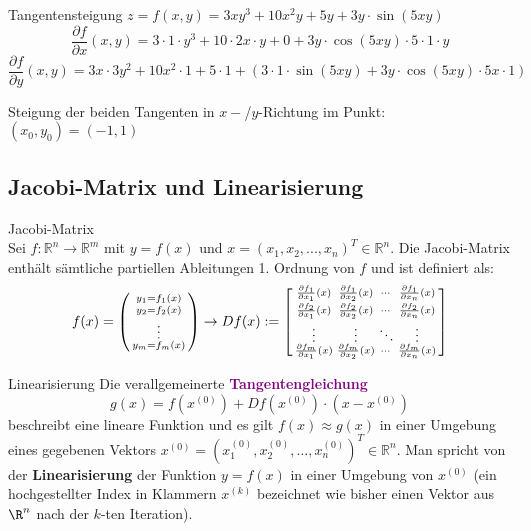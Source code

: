 \begin{example2}{Tangentensteigung}
$z=f(x, y)=3 x y^3+10 x^2 y+5 y+3 y \cdot \sin (5 x y)$
$$\frac{\partial f}{\partial x}(x, y)=3 \cdot 1 \cdot y^3+10 \cdot 2 x \cdot y+0+3 y \cdot \cos (5 x y) \cdot 5 \cdot 1 \cdot y$$
$$\frac{\partial f}{\partial y}(x, y)=3 x \cdot 3 y^2+10 x^2 \cdot 1+5 \cdot 1+(3 \cdot 1 \cdot \sin (5 x y)+3 y \cdot \cos (5 x y) \cdot 5 x \cdot 1)$$

Steigung der beiden Tangenten in $x-$/$y$-Richtung im Punkt: \\
$\left(x_0, y_0\right)=(-1,1)$
\end{example2}

\subsection{Jacobi-Matrix und Linearisierung}

\begin{definition}{Jacobi-Matrix}\\
Sei $f: \mathbb{R}^n \rightarrow \mathbb{R}^m$ mit $y = f(x)$ und $x = (x_1, x_2, ..., x_n)^T \in \mathbb{R}^n$. 
Die Jacobi-Matrix enthält sämtliche partiellen Ableitungen 1. Ordnung von $f$ und ist definiert als:
$$f(x) = \begin{psmallmatrix}
    y_1=f_1(x) \\
    y_2=f_2(x) \\
    \vdots \\
    y_m=f_m(x)
\end{psmallmatrix} \rightarrow 
Df(x) := \begin{bsmallmatrix}
\frac{\partial f_1}{\partial x_1}(x) & \frac{\partial f_1}{\partial x_2}(x) & \cdots & \frac{\partial f_1}{\partial x_n}(x) \\
\frac{\partial f_2}{\partial x_1}(x) & \frac{\partial f_2}{\partial x_2}(x) & \cdots & \frac{\partial f_2}{\partial x_n}(x) \\
\vdots & \vdots & \ddots & \vdots \\
\frac{\partial f_m}{\partial x_1}(x) & \frac{\partial f_m}{\partial x_2}(x) & \cdots & \frac{\partial f_m}{\partial x_n}(x)
\end{bsmallmatrix}$$
\end{definition}

\begin{concept}{Linearisierung}
Die verallgemeinerte \textcolor{purple}{\textbf{Tangentengleichung}}
$$g(x) = f(x^{(0)}) + Df(x^{(0)}) \cdot (x - x^{(0)})$$
beschreibt eine lineare Funktion und es gilt $f(x) \approx g(x)$ in einer Umgebung eines gegebenen Vektors $x^{(0)}=(x_1^{(0)}, x_2^{(0)}, \ldots, x_n^{(0)})^T \in \mathbb{R}^n$. 
Man spricht von der \textbf{Linearisierung} der Funktion $y = f(x)$ in einer Umgebung von $x^{(0)}$ (ein hochgestellter Index in Klammern $x^{(k)}$ bezeichnet wie bisher einen Vektor aus $\R^n$ nach der $k$-ten Iteration).
\end{concept}

